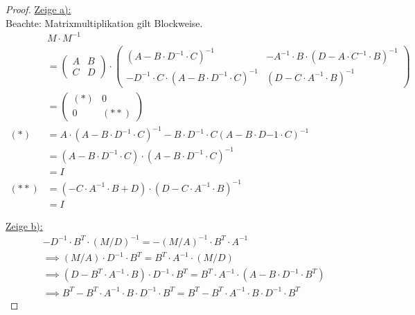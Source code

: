 \begin{proof}
	\underline{Zeige a):}\\
	Beachte: Matrixmultiplikation gilt Blockweise.
	\begin{align*}
		&M\cdot M^{-1}\\
		&=\begin{pmatrix}
			A & B\\ C & D
		\end{pmatrix}\cdot\begin{pmatrix}
			(A-B\cdot D^{-1}\cdot C)^{-1} & -A^{-1}\cdot B\cdot(D-A\cdot C^{-1}\cdot B)^{-1}\\
			-D^{-1}\cdot C\cdot(A-B\cdot D^{-1}\cdot C)^{-1} & (D-C\cdot A^{-1}\cdot B)^{-1}
		\end{pmatrix}\\
		&=\begin{pmatrix}
			(\ast) & 0\\
			0 & (\ast\ast)
		\end{pmatrix}\\
		(\ast)
		&=A\cdot(A-B\cdot D^{-1}\cdot C)^{-1}-B\cdot D^{-1}\cdot C(A-B\cdot D{-1}\cdot C)^{-1}\\
		&=(A-B\cdot D^{-1}\cdot C)\cdot(A-B\cdot D^{-1}\cdot C)^{-1}\\
		&=I\\
		(\ast\ast)
		&=(-C\cdot A^{-1}\cdot B+D)\cdot(D-C\cdot A^{-1}\cdot B)^{-1}\\
		&=I
	\end{align*}

	\underline{Zeige b):}
	\begin{align}\label{3b1}\tag{$\ast$} 
		&-D^{-1}\cdot B^T\cdot(M/D)^{-1}
		=-(M/A)^{-1}\cdot B^T\cdot A^{-1}\\\nonumber
		&\implies
		(M/A)\cdot D^{-1}\cdot B^T=B^T\cdot A^{-1}\cdot(M/D)\\\nonumber
		&\implies
		(D-B^T\cdot A^{-1}\cdot B)\cdot D^{-1}\cdot B^T=B^T\cdot A^{-1}\cdot(A-B\cdot D^{-1}\cdot B^T)\\\nonumber
		&\implies
		B^T-B^T\cdot A^{-1}\cdot B\cdot D^{-1}\cdot B^T
		=B^T-B^T\cdot A^{-1}\cdot B\cdot D^{-1}\cdot B^T
	\end{align}


\end{proof}
